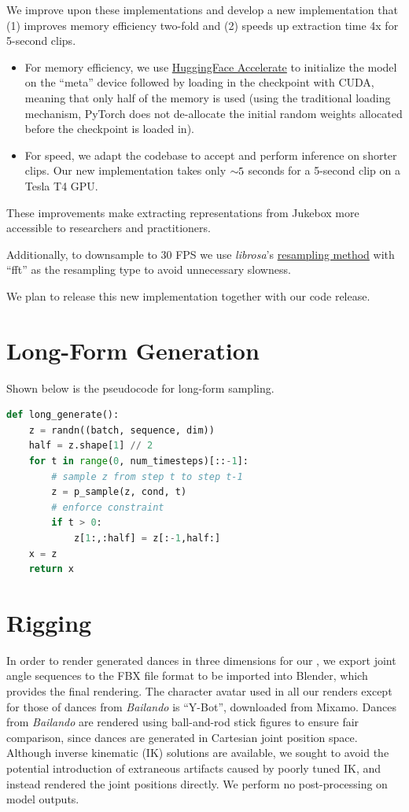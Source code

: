 We improve upon these implementations and develop a new implementation that (1) improves memory efficiency two-fold and (2) speeds up extraction time 4x for 5-second clips.

\begin{itemize}
    \item For memory efficiency, we use \href{https://huggingface.co/docs/accelerate/v0.11.0/en/big_modeling}{HuggingFace Accelerate} to initialize the model on the ``meta'' device followed by loading in the checkpoint with CUDA, meaning that only half of the memory is used (using the traditional loading mechanism, PyTorch does not de-allocate the initial random weights allocated before the checkpoint is loaded in).
    \item For speed, we adapt the codebase to accept and perform inference on shorter clips.
    Our new implementation takes only $\sim\hspace{-3pt}5$ seconds for a 5-second clip on a Tesla T4 GPU.
\end{itemize}

These improvements make extracting representations from Jukebox more accessible to researchers and practitioners.

Additionally, to downsample to 30 FPS we use \textit{librosa}'s \href{https://librosa.org/doc/main/generated/librosa.resample.html}{resampling method} with ``fft'' as the resampling type to avoid unnecessary slowness.

We plan to release this new implementation together with our code release.

\section{Long-Form Generation}

Shown below is the pseudocode for long-form sampling.

\begin{lstlisting}[language=Python]
def long_generate():
    z = randn((batch, sequence, dim))
    half = z.shape[1] // 2
    for t in range(0, num_timesteps)[::-1]:
        # sample z from step t to step t-1
        z = p_sample(z, cond, t)
        # enforce constraint
        if t > 0:
            z[1:,:half] = z[:-1,half:]
    x = z
    return x
\end{lstlisting}

\section{Rigging}
In order to render generated dances in three dimensions for our \website, we export joint angle sequences to the FBX file format to be imported into Blender, which provides the final rendering. The character avatar used in all our renders except for those of dances from \textit{Bailando} is ``Y-Bot'', downloaded from Mixamo. Dances from \textit{Bailando} are rendered using ball-and-rod stick figures to ensure fair comparison, since dances are generated in Cartesian joint position space. Although inverse kinematic (IK) solutions are available, we sought to avoid the potential introduction of extraneous artifacts caused by poorly tuned IK, and instead rendered the joint positions directly. We perform no post-processing on model outputs.
